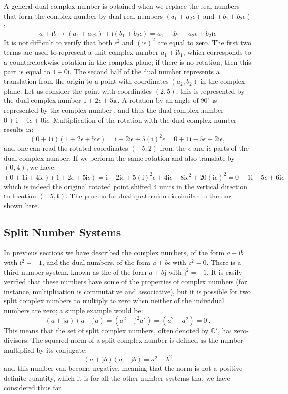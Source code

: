 A general dual complex number is obtained when we replace the real numbers that form the complex number by dual real numbers $(a_1+a_2\epsilon)$ and $(b_1+b_2\epsilon)$:
\[
	a+\mathrm{i}b \rightarrow (a_1+a_2\epsilon)+\mathrm{i}(b_1+b_2\epsilon) = a_1+\mathrm{i} b_1 + a_2\epsilon + b_2\mathrm{i}\epsilon
\]
It is not difficult to verify that both $\epsilon^2$ and $(\mathrm{i}\epsilon)^2$ are equal to zero.  The first two terms are used to represent a unit complex number $a_1+\mathrm{i} b_1$, which corresponds to a counterclockwise rotation in the complex plane; if there is no rotation, then this part is equal to $1+0\mathrm{i}$.  The second half of the dual number represents a translation from the origin to a point with coordinates $(a_2,b_2)$ in the complex plane.  Let us consider the point with coordinates $(2,5)$; this is represented by the dual complex number $1+2\epsilon+5\mathrm{i}\epsilon$.  A rotation by an angle of $90^{\circ}$ is represented by the complex number $\mathrm{i}$ and thus the dual complex number $0+\mathrm{i}+0\epsilon+0\mathrm{i}\epsilon$.  Multiplication of the rotation with the dual complex number results in:
\[
 (0+1\mathrm{i}) (1+2\epsilon+5\mathrm{i}\epsilon) = \mathrm{i} + 2\mathrm{i}\epsilon + 5 (\mathrm{i})^2\epsilon = 0 + 1\mathrm{i}-5\epsilon + 2\mathrm{i}\epsilon,
\]
and one can read the rotated coordinates $(-5,2)$ from the $\epsilon$ and $\mathrm{i}\epsilon$ parts of the dual complex number.  If we perform the same rotation and also translate by $(0,4)$, we have:
\[
 (0+1\mathrm{i}+4\mathrm{i}\epsilon) (1+2\epsilon+5\mathrm{i}\epsilon) = \mathrm{i} + 2\mathrm{i}\epsilon + 5 (\mathrm{i})^2\epsilon +4\mathrm{i}\epsilon +8\mathrm{i}\epsilon^2+20(\mathrm{i}\epsilon)^2 = 0 + 1\mathrm{i}-5\epsilon + 6\mathrm{i}\epsilon
\]
which is indeed the original rotated point shifted $4$ units in the vertical direction to location $(-5,6)$.  The process for dual quaternions is similar to the one shown here. 


\subsection{Split Number Systems}\label{\chabbr:ssec:splitnumbers}
In previous sections we have described the complex numbers, of the form $a+\mathrm{i}b$ with $\mathrm{i}^2=-1$, and the dual numbers, of the form $a+b\epsilon$ with $\epsilon^2=0$. There is a third number system, known as the  of the form $a+b\mathrm{j}$ with $\mathrm{j}^2=+1$.  It is easily verified that these numbers have some of the properties of complex numbers (for instance, multiplication is commutative and associative), but it is possible for two split complex numbers to multiply to zero when neither of the individual numbers are zero; a simple example would be:
\[
	(a+\mathrm{j}a)(a-\mathrm{j}a) = (a^2 - \mathrm{j}^2 a^2) = (a^2-a^2) = 0\ .
\]
This means that the set of split complex numbers, often denoted by $\mathbb{C}'$, has zero-divisors.  The squared norm of a split complex number is defined as the number multiplied by its conjugate:
\[
	(a+\mathrm{j}b)(a-\mathrm{j}b) = a^2-b^2
\]
and this number can become negative, meaning that the norm is not a positive-definite quantity, which it is for all the other number systems  that we have considered thus far.  

